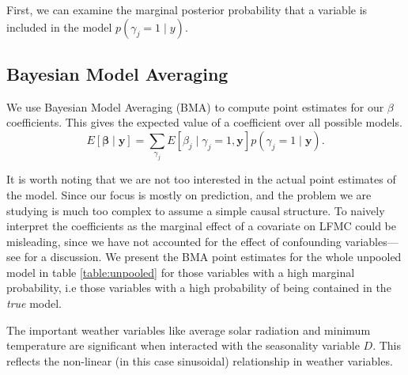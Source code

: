 \documentclass[twocolumn,10pt]{article}
\begin{document}
First, we can examine the marginal posterior probability that a variable is included in the model $p(\gamma_j = 1 \;|\; y)$.





\subsection{Bayesian Model Averaging}

We use Bayesian Model Averaging (BMA) to compute point estimates for our $\beta$ coefficients. 
This gives the expected value of a coefficient over all possible models.
\[
    E\left[\bm{\bm{\beta}} \;|\; \bm{y}\right] = \sum_{\gamma_j}^{} E\left[\beta_j \;|\; \gamma_j = 1, \bm{y}\right] p(\gamma_j = 1 \;|\; \bm{y}).
\]

It is worth noting that we are not too interested in the actual point estimates of the model. Since our focus is mostly on prediction, and the problem
we are studying is much too complex to assume a simple causal structure. 
To naively interpret the coefficients as the marginal effect of a covariate on LFMC could be misleading, since we have not accounted for the effect of confounding variables---see \citep{westreich2013} for a discussion.
We present the BMA point estimates for the whole unpooled model in table \ref{table:unpooled} for those variables with a high marginal probability, i.e those variables with a high probability of being contained in the \emph{true} model. %

The important weather variables like average solar radiation and minimum temperature are significant when interacted with the seasonality variable $D$. This reflects the non-linear (in this case sinusoidal) relationship in weather variables. 
\end{document}
